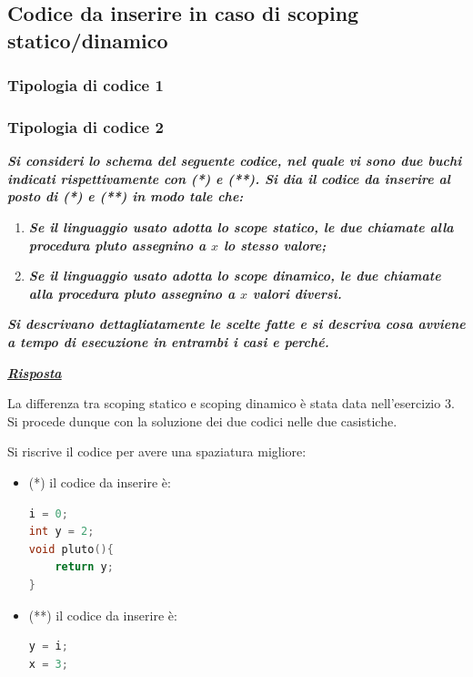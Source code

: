 \documentclass[a4paper]{article}
\begin{document}
	\subsection{Codice da inserire in caso di scoping statico/dinamico}
	
	\subsubsection{Tipologia di codice 1}
	\newpage
	
	\subsubsection{Tipologia di codice 2}
	
	\textcolor{Red3}{\textbf{\emph{Si consideri lo schema del seguente codice, nel quale vi sono due buchi indicati rispettivamente con (*) e (**). Si dia il codice da inserire al posto di (*) e (**) in modo tale che:}}}
	\begin{enumerate}[label=(\alph*)]
		\item \textcolor{Red3}{\textbf{\emph{Se il linguaggio usato adotta lo scope statico, le due chiamate alla procedura pluto assegnino a $x$ lo stesso valore;}}}
		
		\item \textcolor{Red3}{\textbf{\emph{Se il linguaggio usato adotta lo scope dinamico, le due chiamate alla procedura pluto assegnino a $x$ valori diversi.}}}
	\end{enumerate}
	\textcolor{Red3}{\textbf{\emph{Si descrivano dettagliatamente le scelte fatte e si descriva cosa avviene a tempo di esecuzione in entrambi i casi e perché.}}}
	
	
	\noindent
	\textcolor{Green4}{\textbf{\emph{\underline{Risposta}}}}\newline
	
	\noindent
	La differenza tra scoping statico e scoping dinamico è stata data nell'esercizio 3. Si procede dunque con la soluzione dei due codici nelle due casistiche.\newline
	
	\noindent
	Si riscrive il codice per avere una spaziatura migliore:
	
	\begin{itemize}
		\item (*) il codice da inserire è:
		\begin{lstlisting}[language=C]
i = 0;
int y = 2;
void pluto(){
	return y;
}\end{lstlisting}
		
		\item (**) il codice da inserire è:
		\begin{lstlisting}[language=C]
y = i;
x = 3;\end{lstlisting}
	\end{itemize}\newpage
	
\end{document}
